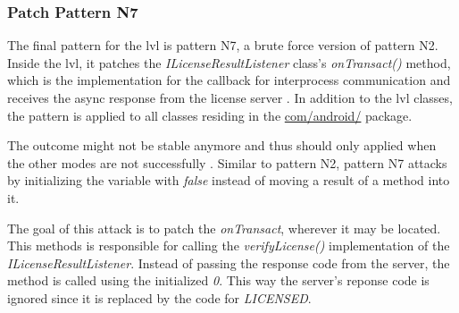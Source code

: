 \subsubsection{Patch Pattern N7}
The final pattern for the \gls{lvl} is pattern N7, a brute force version of pattern N2.
Inside the lvl, it patches the \textit{ILicenseResultListener} class's \textit{onTransact()} method, which is the implementation for the callback for interprocess communication and receives the async response from the license server \cite{developersLicensingReference}.
In addition to the lvl classes, the pattern is applied to all classes residing in the \url{com/android/} package.

The outcome might not be stable anymore and thus should only applied when the other modes are not successfully .
\newline
Similar to pattern N2, pattern N7 attacks by initializing the variable with \textit{false} instead of moving a result of a method into it.
\newline

The goal of this attack is to patch the \textit{onTransact}, wherever it may be located.
This methods is responsible for calling the \textit{verifyLicense()} implementation of the \textit{ILicenseResultListener}.
Instead of passing the response code from the server, the method is called using the initialized \textit{0}.
This way the server's reponse code is ignored since it is replaced by the code for \textit{LICENSED}.

